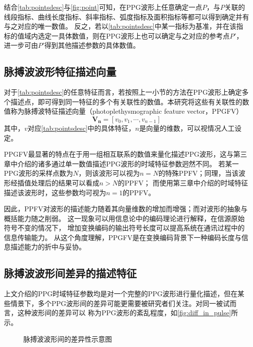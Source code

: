 结合\autoref{tab:pointsdesc}与\autoref{fig:point}可知，在PPG波形上任意确定一点$P$，与$P$关联的线段指标、曲线长度指标、斜率指标、弧度指标及面积指标等都可以得到确定并有与之对应的唯一数值。
反之，若以\autoref{tab:pointsdesc}中某一指标为基准，并在该指标的值域内选定一具体数值，则在PPG波形上也可以确定与之对应的参考点$P'$，进一步可由$P'$得到其他描述参数的具体数值。

\subsection{脉搏波波形特征描述向量}

对于\autoref{tab:pointsdesc}的任意特征而言，若按照上一小节的方法在PPG波形上确定多个描述点，即可得到同一特征的多个有关联性的数值。本研究将这些有关联性的数值称为脉搏波特征描述向量（photoplethysmographic feature vector，PPGFV）
\begin{equation}
  \label{equ:featurevector}
  \boldsymbol {V_n}=[v_0,v_1,\cdots,v_{n-1}]
\end{equation}
其中，$v$对应\autoref{tab:pointsdesc}中的具体特征，$n$是向量的维数，可以视情况人工设定。

PPGFV最显著的特点在于用一组相互联系的数值来量化描述PPG波形，这与第三章中介绍的诸多通过单一数值描述PPG波形的时域特征参数迥然不同。
若某一PPG波形的采样点数为$N$，则该波形可以视为$n=N$的特殊PPFV；同理，当该波形经插值处理后的结果可以看成$n>N$的PPFV；
而使用第三章中介绍的时域特征描述该波形时，这些参数均可视为$n=1$的PPFV。

因此，PPFV对波形的描述能力随着其向量维数的增加而增强；而对波形的抽象与概括能力随之削弱。
这一现象可以用信息论中的编码理论进行解释，在信源原始符号不变的情况下，
增加变换编码的输出符号长度可以提高系统在通讯过程中的信息传输能力\cite{Zhao2017}。
从这个角度理解，PPGFV是在变换编码背景下一种编码长度与信息描述能力的折中与妥协。

\subsection{脉搏波波形间差异的描述特征}
上文介绍的PPG时域特征参数均是对一个完整的PPG波形进行量化描述，但在某些情景下，多个PPG波形间的差异可能更需要被研究者们关注。对同一被试而言，这种波形间的差异可以
称为PPG波形的紊乱程度，如\autoref{fig:diff_in_pulse}所示。

\begin{figure}[htbp]
  \centering
  \quad
  \caption[脉搏波波形间的差异性]{\label{fig:diff_in_pulse}脉搏波波形间的差异性示意图}
\end{figure}

